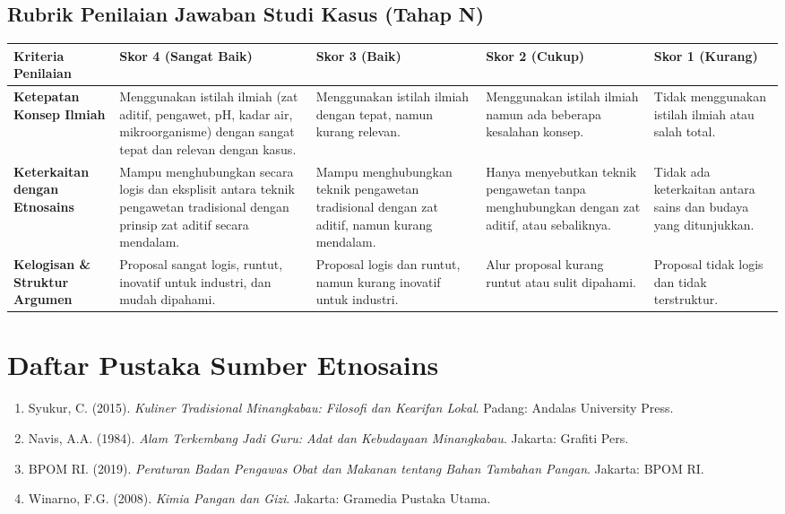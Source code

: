 \documentclass[a4paper,12pt]{article}
\begin{document}
\subsection{Rubrik Penilaian Jawaban Studi Kasus (Tahap N)}

\begin{longtable}{|p{3cm}|p{3cm}|p{3cm}|p{3cm}|p{3cm}|}
\hline
\textbf{Kriteria Penilaian} & \textbf{Skor 4 (Sangat Baik)} & \textbf{Skor 3 (Baik)} & \textbf{Skor 2 (Cukup)} & \textbf{Skor 1 (Kurang)} \\
\hline
\textbf{Ketepatan Konsep Ilmiah} & Menggunakan istilah ilmiah (zat aditif, pengawet, pH, kadar air, mikroorganisme) dengan sangat tepat dan relevan dengan kasus. & Menggunakan istilah ilmiah dengan tepat, namun kurang relevan. & Menggunakan istilah ilmiah namun ada beberapa kesalahan konsep. & Tidak menggunakan istilah ilmiah atau salah total. \\
\hline
\textbf{Keterkaitan dengan Etnosains} & Mampu menghubungkan secara logis dan eksplisit antara teknik pengawetan tradisional dengan prinsip zat aditif secara mendalam. & Mampu menghubungkan teknik pengawetan tradisional dengan zat aditif, namun kurang mendalam. & Hanya menyebutkan teknik pengawetan tanpa menghubungkan dengan zat aditif, atau sebaliknya. & Tidak ada keterkaitan antara sains dan budaya yang ditunjukkan. \\
\hline
\textbf{Kelogisan \& Struktur Argumen} & Proposal sangat logis, runtut, inovatif untuk industri, dan mudah dipahami. & Proposal logis dan runtut, namun kurang inovatif untuk industri. & Alur proposal kurang runtut atau sulit dipahami. & Proposal tidak logis dan tidak terstruktur. \\
\hline
\end{longtable}

\section{Daftar Pustaka Sumber Etnosains}

\begin{enumerate}
\item Syukur, C. (2015). \textit{Kuliner Tradisional Minangkabau: Filosofi dan Kearifan Lokal}. Padang: Andalas University Press.
\item Navis, A.A. (1984). \textit{Alam Terkembang Jadi Guru: Adat dan Kebudayaan Minangkabau}. Jakarta: Grafiti Pers.
\item BPOM RI. (2019). \textit{Peraturan Badan Pengawas Obat dan Makanan tentang Bahan Tambahan Pangan}. Jakarta: BPOM RI.
\item Winarno, F.G. (2008). \textit{Kimia Pangan dan Gizi}. Jakarta: Gramedia Pustaka Utama.
\end{enumerate}
\end{document}
